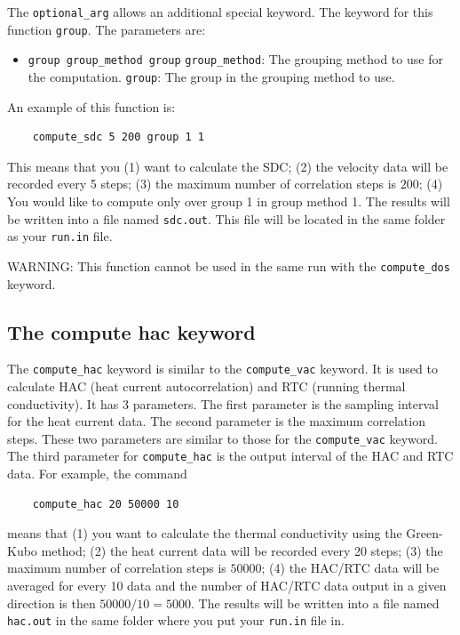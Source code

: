 \documentclass[12pt,a4paper]{report}
\begin{document}
The \verb"optional_arg" allows an additional special keyword. The keyword for this function \verb"group". The parameters are:
\begin{itemize}
    \item \verb"group group_method group"
    \subitem \verb"group_method": The grouping method to use for the computation.
    \subitem \verb"group": The group in the grouping method to use.
\end{itemize}

An example of this function is:
\begin{verbatim}
    compute_sdc 5 200 group 1 1
\end{verbatim}

This means that you (1) want to calculate the SDC; (2) the velocity data will be recorded every 5 steps; (3) the maximum number of correlation steps is $200$; (4) You would like to compute only over group 1 in group method 1. The results will be written into a file named \verb"sdc.out". This file will be located in the same folder as your \verb"run.in" file.

WARNING: This function cannot be used in the same run with the \verb"compute_dos" keyword.

\subsection{The compute hac keyword}

The \verb"compute_hac" keyword is similar to the \verb"compute_vac" keyword. It is used to calculate HAC (heat current autocorrelation) and RTC (running thermal conductivity).
It has 3 parameters. The first parameter is the sampling interval for the heat current data. The second parameter is the maximum correlation steps. These two parameters are similar to those for the \verb"compute_vac" keyword. The third parameter for \verb"compute_hac" is the output interval of the HAC and RTC data. For example, the command
\begin{verbatim}
    compute_hac 20 50000 10
\end{verbatim}
means that (1) you want to calculate the thermal conductivity using the Green-Kubo method; (2) the heat current data will be recorded every 20 steps; (3) the maximum number of correlation steps is $50000$; (4) the HAC/RTC data will be averaged for every 10 data and the number of HAC/RTC data output in a given direction is then $50000/10=5000$. The results will be written into a file named \verb"hac.out" in the same folder where you put your \verb"run.in" file in.
\end{document}
